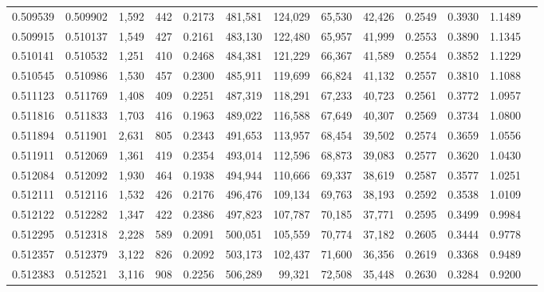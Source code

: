 \begin{tabular}{rrrrrrrrrrrrr}
0.509539 & 0.509902 & 1,592 &   442 &                                     0.2173 & 481,581 & 124,029 &  65,530 &  42,426 & 0.2549 & 0.3930 & 1.1489 \\
0.509915 & 0.510137 & 1,549 &   427 &                                     0.2161 & 483,130 & 122,480 &  65,957 &  41,999 & 0.2553 & 0.3890 & 1.1345 \\
0.510141 & 0.510532 & 1,251 &   410 &                                     0.2468 & 484,381 & 121,229 &  66,367 &  41,589 & 0.2554 & 0.3852 & 1.1229 \\
0.510545 & 0.510986 & 1,530 &   457 &                                     0.2300 & 485,911 & 119,699 &  66,824 &  41,132 & 0.2557 & 0.3810 & 1.1088 \\
0.511123 & 0.511769 & 1,408 &   409 &                                     0.2251 & 487,319 & 118,291 &  67,233 &  40,723 & 0.2561 & 0.3772 & 1.0957 \\
0.511816 & 0.511833 & 1,703 &   416 &                                     0.1963 & 489,022 & 116,588 &  67,649 &  40,307 & 0.2569 & 0.3734 & 1.0800 \\
0.511894 & 0.511901 & 2,631 &   805 &                                     0.2343 & 491,653 & 113,957 &  68,454 &  39,502 & 0.2574 & 0.3659 & 1.0556 \\
0.511911 & 0.512069 & 1,361 &   419 &                                     0.2354 & 493,014 & 112,596 &  68,873 &  39,083 & 0.2577 & 0.3620 & 1.0430 \\
0.512084 & 0.512092 & 1,930 &   464 &                                     0.1938 & 494,944 & 110,666 &  69,337 &  38,619 & 0.2587 & 0.3577 & 1.0251 \\
0.512111 & 0.512116 & 1,532 &   426 &                                     0.2176 & 496,476 & 109,134 &  69,763 &  38,193 & 0.2592 & 0.3538 & 1.0109 \\
0.512122 & 0.512282 & 1,347 &   422 &                                     0.2386 & 497,823 & 107,787 &  70,185 &  37,771 & 0.2595 & 0.3499 & 0.9984 \\
0.512295 & 0.512318 & 2,228 &   589 &                                     0.2091 & 500,051 & 105,559 &  70,774 &  37,182 & 0.2605 & 0.3444 & 0.9778 \\
0.512357 & 0.512379 & 3,122 &   826 &                                     0.2092 & 503,173 & 102,437 &  71,600 &  36,356 & 0.2619 & 0.3368 & 0.9489 \\
0.512383 & 0.512521 & 3,116 &   908 &                                     0.2256 & 506,289 &  99,321 &  72,508 &  35,448 & 0.2630 & 0.3284 & 0.9200 \\

\end{tabular}
